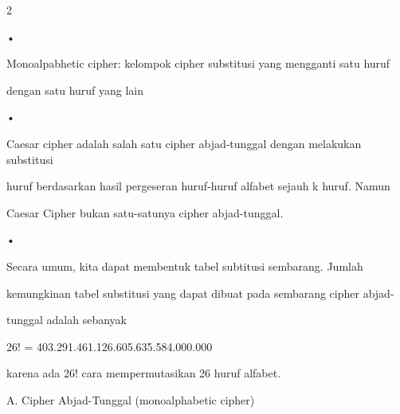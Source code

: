 \documentclass{article}
\begin{document}

2

•

Monoalpabhetic cipher: kelompok cipher substitusi yang mengganti satu huruf 

dengan satu huruf yang lain 

•

Caesar cipher adalah salah satu cipher abjad-tunggal dengan melakukan substitusi 

huruf berdasarkan hasil  pergeseran huruf-huruf  alfabet sejauh k huruf. Namun 

Caesar Cipher bukan satu-satunya cipher abjad-tunggal.

•

Secara umum,  kita dapat membentuk tabel subtitusi sembarang. Jumlah 

kemungkinan tabel substitusi yang dapat dibuat pada sembarang cipher abjad-

tunggal adalah sebanyak 


   26! = 403.291.461.126.605.635.584.000.000 

      karena ada 26! cara mempermutasikan 26 huruf alfabet.

A. Cipher Abjad-Tunggal (monoalphabetic cipher)
\end{document}
